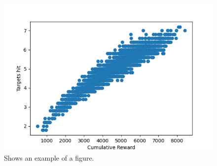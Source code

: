 \begin{figure}
    \centering
    \includegraphics[width=\singlefigure]{figures/figure_3.png}
    \caption{\label{fig:example} Shows an example of a figure.}
\end{figure}